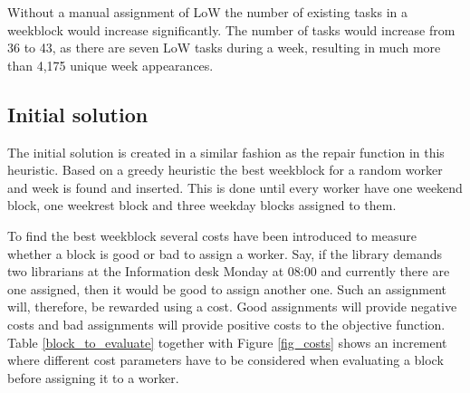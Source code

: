 Without a manual assignment of LoW the number of existing tasks in a weekblock would increase significantly. The number of tasks would increase from 36 to 43, as there are seven LoW tasks during a week, resulting in much more than 4,175 unique week appearances. %

\subsection{Initial solution} \label{initial_solution}
The initial solution is created in a similar fashion as the repair function in this heuristic. Based on a greedy heuristic the best weekblock for a random worker and week is found and inserted. This is done until every worker have one weekend block, one weekrest block and three weekday blocks assigned to them.

To find the best weekblock several costs have been introduced to measure whether a block is good or bad to assign a worker. Say, if the library demands two librarians at the Information desk Monday at 08:00 and currently there are one assigned, then it would be good to assign another one. Such an assignment will, therefore, be rewarded using a cost. Good assignments will provide negative costs and bad assignments will provide positive costs to the objective function. Table \ref{block_to_evaluate} together with Figure \ref{fig_costs} shows an increment where different cost parameters have to be considered when evaluating a block before assigning it to a worker. 

